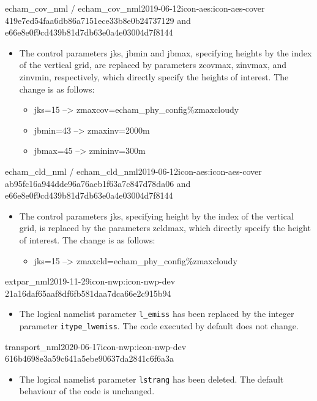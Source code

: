 \begin{changeitem}{echam\_cov\_nml / echam\_cov\_nml}{2019-06-12}{icon-aes:icon-aes-cover 419e7ed54faa6db86a7151ece33b8e0b24737129 and e66e8e0f9cd439b81d7db63e0a4e03004d7f8144}
  \begin{itemize}
   \item The control parameters jks, jbmin and jbmax, specifying heights by the index of the vertical grid, are replaced by parameters zcovmax, zinvmax, and zinvmin, respectively, which directly specify the heights of interest. The change is as follows: \newline
   \begin{itemize}
    \item jks=15 --> zmaxcov=echam\_phy\_config\%zmaxcloudy
    \item jbmin=43 --> zmaxinv=2000m
    \item jbmax=45 --> zmininv=300m
   \end{itemize}
  \end{itemize}
\end{changeitem}

\begin{changeitem}{echam\_cld\_nml / echam\_cld\_nml}{2019-06-12}{icon-aes:icon-aes-cover ab95fc16a944dde96a76aeb1f63a7c847d78da06 and e66e8e0f9cd439b81d7db63e0a4e03004d7f8144}
  \begin{itemize}
   \item The control parameters jks, specifying height by the index of the vertical grid, is replaced by the parameters zcldmax, which directly specify the height of interest. The change is as follows: \newline
   \begin{itemize}
    \item jks=15 --> zmaxcld=echam\_phy\_config\%zmaxcloudy
   \end{itemize}
  \end{itemize}
\end{changeitem}

\begin{changeitem}{extpar\_nml}{2019-11-29}{icon-nwp:icon-nwp-dev 21a16daf65aaf8df6fb581daa7dca66e2c915b94}
  \begin{itemize}
   \item The logical namelist parameter \texttt{l\_emiss} has been replaced by the integer parameter \texttt{itype\_lwemiss}.
     The code executed by default does not change.
  \end{itemize}
\end{changeitem}

\begin{changeitem}{transport\_nml}{2020-06-17}{icon-nwp:icon-nwp-dev 616b4698e3a59c641a5ebe90637da2841c6f6a3a}
  \begin{itemize}
   \item The logical namelist parameter \texttt{lstrang} has been deleted. The default behaviour of the code is unchanged.
  \end{itemize}
\end{changeitem}

